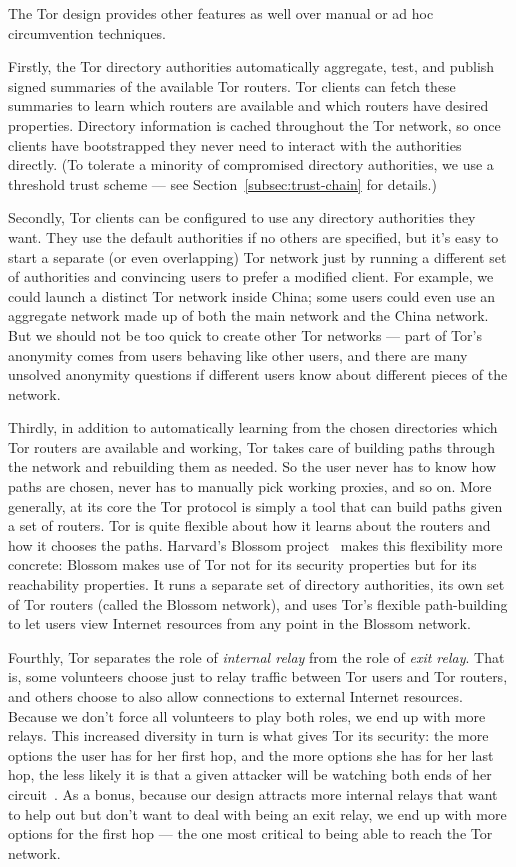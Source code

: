 \documentclass{llncs}
\begin{document}
The Tor design provides other features as well over manual or ad
hoc circumvention techniques.

Firstly, the Tor directory authorities automatically aggregate, test,
and publish signed summaries of the available Tor routers. Tor clients
can fetch these summaries to learn which routers are available and
which routers have desired properties. Directory information is cached
throughout the Tor network, so once clients have bootstrapped they never
need to interact with the authorities directly. (To tolerate a minority
of compromised directory authorities, we use a threshold trust scheme ---
see Section~\ref{subsec:trust-chain} for details.)

Secondly, Tor clients can be configured to use any directory authorities
they want. They use the default authorities if no others are specified,
but it's easy to start a separate (or even overlapping) Tor network just
by running a different set of authorities and convincing users to prefer
a modified client. For example, we could launch a distinct Tor network
inside China; some users could even use an aggregate network made up of
both the main network and the China network. But we should not be too
quick to create other Tor networks --- part of Tor's anonymity comes from
users behaving like other users, and there are many unsolved anonymity
questions if different users know about different pieces of the network.

Thirdly, in addition to automatically learning from the chosen directories
which Tor routers are available and working, Tor takes care of building
paths through the network and rebuilding them as needed. So the user
never has to know how paths are chosen, never has to manually pick
working proxies, and so on. More generally, at its core the Tor protocol
is simply a tool that can build paths given a set of routers. Tor is
quite flexible about how it learns about the routers and how it chooses
the paths. Harvard's Blossom project~\cite{blossom-thesis} makes this
flexibility more concrete: Blossom makes use of Tor not for its security
properties but for its reachability properties. It runs a separate set
of directory authorities, its own set of Tor routers (called the Blossom
network), and uses Tor's flexible path-building to let users view Internet
resources from any point in the Blossom network.

Fourthly, Tor separates the role of \emph{internal relay} from the
role of \emph{exit relay}. That is, some volunteers choose just to relay
traffic between Tor users and Tor routers, and others choose to also allow
connections to external Internet resources. Because we don't force all
volunteers to play both roles, we end up with more relays. This increased
diversity in turn is what gives Tor its security: the more options the
user has for her first hop, and the more options she has for her last hop,
the less likely it is that a given attacker will be watching both ends
of her circuit~\cite{tor-design}. As a bonus, because our design attracts
more internal relays that want to help out but don't want to deal with
being an exit relay, we end up with more options for the first hop ---
the one most critical to being able to reach the Tor network.
\end{document}

